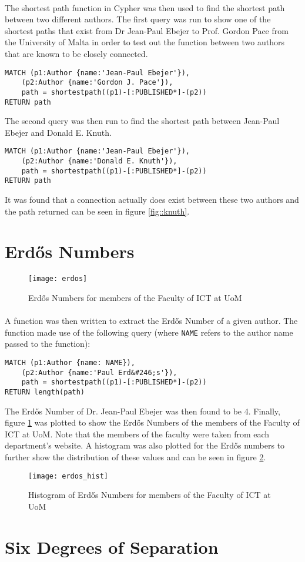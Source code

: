 \paragraph{ }The shortest path function in Cypher was then used to find the shortest path between two different authors. The first query was run to show one of the shortest paths that exist from Dr Jean-Paul Ebejer to Prof. Gordon Pace from the University of Malta in order to test out the function between two authors that are known to be closely connected.
\begin{verbatim}
MATCH (p1:Author {name:'Jean-Paul Ebejer'}),
    (p2:Author {name:'Gordon J. Pace'}),
    path = shortestpath((p1)-[:PUBLISHED*]-(p2))
RETURN path
\end{verbatim}
The second query was then run to find the shortest path between Jean-Paul Ebejer and Donald E. Knuth.
\begin{verbatim}
MATCH (p1:Author {name:'Jean-Paul Ebejer'}),
    (p2:Author {name:'Donald E. Knuth'}),
    path = shortestpath((p1)-[:PUBLISHED*]-(p2))
RETURN path
\end{verbatim}
It was found that a connection actually does exist between these two authors and the path returned can be seen in figure \ref{fig::knuth}.

\section{Erd\H{o}s Numbers}

\begin{figure}[!b]
	\centering
	\texttt{[image: erdos]}
	\caption[Erd\H{o}s Numbers]{Erd\H{o}s Numbers for members of the Faculty of ICT at UoM}
	\label{fig::erdos}
\end{figure}

\paragraph{ }A function was then written to extract the Erd\H{o}s Number of a given author. The function made use of the following query (where \texttt{NAME} refers to the author name passed to the function):
\begin{verbatim}
MATCH (p1:Author {name: NAME}),
    (p2:Author {name:'Paul Erd&#246;s'}),
    path = shortestpath((p1)-[:PUBLISHED*]-(p2))
RETURN length(path)
\end{verbatim} 
The Erd\H{o}s Number of Dr. Jean-Paul Ebejer was then found to be 4. Finally, figure \ref{fig::erdos} was plotted to show the Erd\H{o}s Numbers of the members of the Faculty of ICT at UoM. Note that the members of the faculty were taken from each department's website. A histogram was also plotted for the Erd\H{o}s numbers to further show the distribution of these values and can be seen in figure \ref{fig::hist_erdos}.

\begin{figure}[!t]
	\centering
	\texttt{[image: erdos\_hist]}
	\caption[Erd\H{o}s Numbers Histogram]{ Histogram of Erd\H{o}s Numbers for members of the Faculty of ICT at UoM}
	\label{fig::hist_erdos}
\end{figure}

\section{Six Degrees of Separation}
